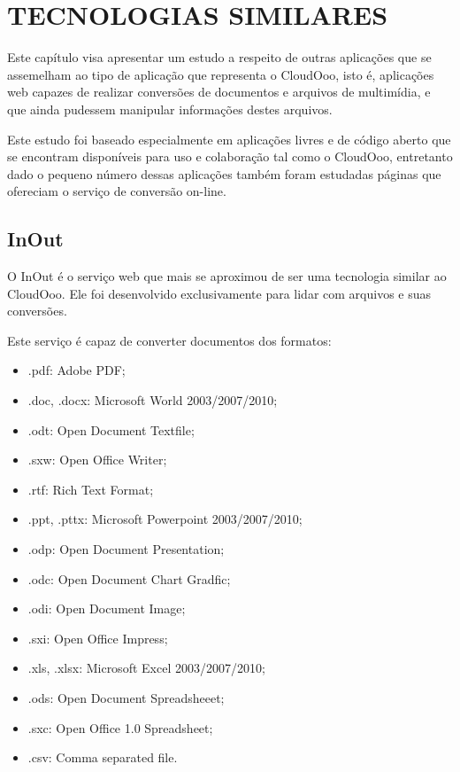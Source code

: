 \chapter{TECNOLOGIAS SIMILARES}
\thispagestyle{empty}

Este capítulo visa apresentar um estudo a respeito de outras aplicações que se assemelham ao tipo de aplicação que representa o CloudOoo, isto é, aplicações web capazes de realizar conversões de documentos e arquivos de multimídia, e que ainda pudessem manipular informações destes arquivos.

Este estudo foi baseado especialmente em aplicações livres e de código aberto que se encontram disponíveis para uso e colaboração tal como o CloudOoo, entretanto dado o pequeno número dessas aplicações também foram estudadas páginas que ofereciam o serviço de conversão on-line.


\section{InOut}

O InOut é o serviço web que mais se aproximou de ser uma tecnologia similar ao CloudOoo. Ele foi desenvolvido exclusivamente para lidar com arquivos e suas conversões.

Este serviço é capaz de converter documentos dos formatos:

\begin{itemize}
    \item{.pdf: Adobe PDF;}
    \item{.doc, .docx: Microsoft World 2003/2007/2010;}
    \item{.odt: Open Document Textfile;}
    \item{.sxw: Open Office Writer;}
    \item{.rtf: Rich Text Format;}
    \item{.ppt, .pttx: Microsoft Powerpoint 2003/2007/2010;}
    \item{.odp: Open Document Presentation;}
    \item{.odc: Open Document Chart Gradfic;}
    \item{.odi: Open Document Image;}
    \item{.sxi: Open Office Impress;}
    \item{.xls, .xlsx: Microsoft Excel 2003/2007/2010;}
    \item{.ods: Open Document Spreadsheeet;}
    \item{.sxc: Open Office 1.0 Spreadsheet;}
    \item{.csv: Comma separated file.}
\end{itemize}


